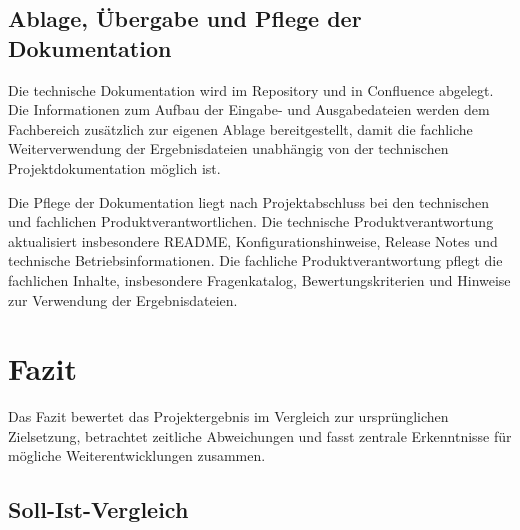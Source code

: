 \documentclass[
  10pt,
  ngerman,
  a4paper,
  toc=graduated,
  numbers=noenddot,
  headings=standardclasses,
  nonumberlist
]{scrartcl}
\begin{document}
\subsection{Ablage, Übergabe und Pflege der Dokumentation}
\label{ablage_uebergabe_und_pflege_der_dokumentation}

Die technische Dokumentation wird im Repository und in Confluence abgelegt. Die Informationen zum Aufbau der Eingabe- und Ausgabedateien werden dem Fachbereich zusätzlich zur eigenen Ablage bereitgestellt, damit die fachliche Weiterverwendung der Ergebnisdateien unabhängig von der technischen Projektdokumentation möglich ist.

Die Pflege der Dokumentation liegt nach Projektabschluss bei den technischen und fachlichen Produktverantwortlichen. Die technische Produktverantwortung aktualisiert insbesondere README, Konfigurationshinweise, Release Notes und technische Betriebsinformationen. Die fachliche Produktverantwortung pflegt die fachlichen Inhalte, insbesondere Fragenkatalog, Bewertungskriterien und Hinweise zur Verwendung der Ergebnisdateien.

\section{Fazit}
\label{fazit}
Das Fazit bewertet das Projektergebnis im Vergleich zur ursprünglichen Zielsetzung, betrachtet zeitliche Abweichungen und fasst zentrale Erkenntnisse für mögliche Weiterentwicklungen zusammen.

\subsection{Soll-Ist-Vergleich}
\label{soll_ist_vergleich}
\end{document}

